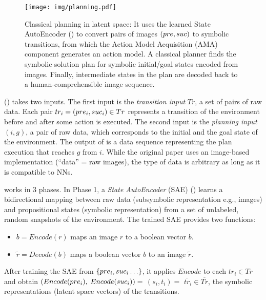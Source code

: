 \begin{figure}[htb]
 \centering
 \texttt{[image: img/planning.pdf]}
 \caption{Classical planning in latent space:
It uses the learned State AutoEncoder () to convert pairs of images $(pre,suc)$ to symbolic transitions,
 from which the Action Model Acquisition (AMA) component generates an action model.
A classical planner finds the symbolic solution plan for symbolic initial/goal states encoded from images.
Finally, intermediate states in the plan are decoded back to a human-comprehensible image sequence.}
\label{fig:overview}
\end{figure}

\latentplanner () takes two inputs.
The first input is the \emph{transition input} $Tr$, a set of pairs of raw data.
Each pair $tr_i=(pre_i, suc_i) \in Tr$ represents a transition of the environment before and after some action is executed.
The second input is the \emph{planning input} $(i, g)$, a pair of raw data, which corresponds to the initial and the goal state of the environment.
The output of \latentplanner is a data sequence representing the plan execution that reaches $g$ from $i$.
While the original paper uses an image-based implementation (``data'' = raw images),
the type of data is arbitrary as long as it is compatible to NNs.


\latentplanner works in 3 phases.
In Phase 1, a \emph{State AutoEncoder} (SAE) () learns a bidirectional mapping between raw data (subsymbolic representation e.g., images)
 and propositional states (symbolic representation) from a set of unlabeled, random snapshots of the environment.
The trained SAE provides two functions:
\begin{itemize} %
\setlength{\itemsep}{-0.3em}
\item $b=Encode(r)$ maps an image  $r$ to a boolean vector $b$.
\item $\tilde{r}=Decode(b)$ maps a boolean vector $b$ to an image $\tilde{r}$.
\end{itemize}
After training the SAE from ${\left\{pre_i, suc_i\ldots\right\}}$,
it applies $Encode$ to each $tr_i \in Tr$ and obtain $(Encode(pre_i),$ $Encode(suc_i))=$ $(s_i,t_i)=$ $\overline{tr}_i\in \overline{Tr}$,
the symbolic representations (latent space vectors) of the transitions.


